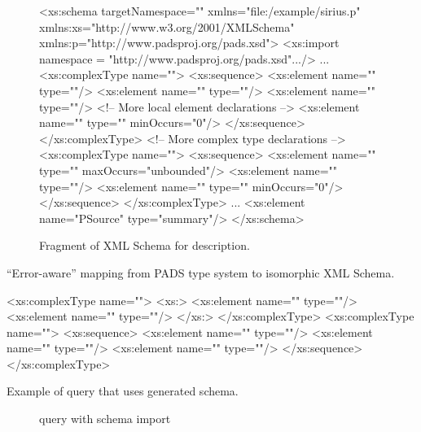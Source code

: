 \begin{figure*}
\begin{small}
\begin{code}
<xs:schema targetNamespace=""
           xmlns="file:/example/sirius.p"
           xmlns:xs="http://www.w3.org/2001/XMLSchema"
           xmlns:p="http://www.padsproj.org/pads.xsd">
<xs:import namespace = "http://www.padsproj.org/pads.xsd".../>
...
<xs:complexType name="">
 <xs:sequence>
  <xs:element name=""     type=""/>
  <xs:element name="" type=""/>
  <xs:element name=""   type=""/>
  <!-- More local element declarations -->
  <xs:element name=""            type="" minOccurs="0"/>
 </xs:sequence>
</xs:complexType>
<!-- More complex type declarations -->
<xs:complexType name="">
 <xs:sequence>
  <xs:element name=""    type="" maxOccurs="unbounded"/>
  <xs:element name="" type=""/>
  <xs:element name=""     type="" minOccurs="0"/>
 </xs:sequence>
</xs:complexType>
...
<xs:element name="PSource" type="summary"/>
</xs:schema>
\end{code}
\end{small}
\caption{Fragment of XML Schema for \dibbler{} \pads{} description.}
\label{figure:dibbler-schema}
\end{figure*}

``Error-aware'' mapping from PADS type system to isomorphic XML
Schema. 
\begin{small}
\begin{code}
<xs:complexType name="">
  <xs:>
   <xs:element name="" type=""/>
   <xs:element name=""  type=""/>
  </xs:>
</xs:complexType>
<xs:complexType name="">
 <xs:sequence>
   <xs:element name=""  type=""/>
   <xs:element name="" type=""/>
   <xs:element name=""     type=""/>
 </xs:sequence>
</xs:complexType>
\end{code}
\end{small}

Example of query that uses generated schema.
\begin{figure*}
\begin{small}
\end{small}
\caption{\padx{} query with schema import}
\label{figure:padx-query}
\end{figure*}

